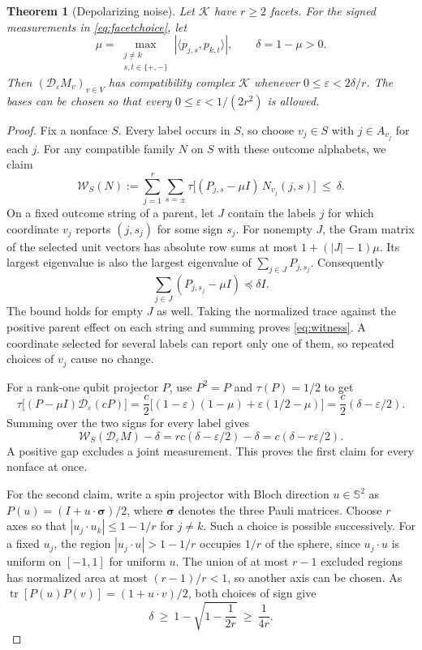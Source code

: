 \documentclass[11pt,a4paper]{article}
\newtheorem{theorem}{Theorem}
\theoremstyle{definition}
\newcommand{\Id}{I}
\newcommand{\tr}{\operatorname{tr}}
\newcommand{\K}{\mathcal K}
\newcommand{\D}{\mathcal D}
\begin{document}
\begin{theorem}[Depolarizing noise]\label{thm:noise}
Let \(\K\) have \(r\ge2\) facets. For the signed measurements
in \eqref{eq:facetchoice}, let
\[
 \mu=\max_{\substack{j\ne k\\s,t\in\{+,-\}}}
                 |\langle p_{j,s},p_{k,t}\rangle|,\qquad
 \delta=1-\mu>0 .
\]
Then \((\D_\varepsilon M_v)_{v\in V}\) has compatibility complex \(\K\)
whenever \(0\le\varepsilon<2\delta/r\). The bases can be chosen so that
every \(0\le\varepsilon<1/(2r^2)\) is allowed.
\end{theorem}
\begin{proof}
Fix a nonface \(S\). Every label occurs in \(S\), so choose \(v_j\in S\)
with \(j\in A_{v_j}\) for each \(j\). For any compatible family \(N\) on
\(S\) with these outcome alphabets, we claim
\begin{equation}\label{eq:witness}
 \mathcal W_S(N):=
 \sum_{j=1}^{r}\sum_{s=\pm}\tau\big[(P_{j,s}-\mu\Id)\,N_{v_j}(j,s)\big]
 \ \le\ \delta .
\end{equation}
On a fixed outcome string of a parent, let \(J\) contain the labels \(j\)
for which coordinate \(v_j\) reports \((j,s_j)\) for some sign \(s_j\).
For nonempty \(J\), the Gram matrix of the selected unit vectors has
absolute row sums at most \(1+(|J|-1)\mu\). Its largest eigenvalue is
also the largest eigenvalue of \(\sum_{j\in J}P_{j,s_j}\). Consequently
\[
   \sum_{j\in J}(P_{j,s_j}-\mu\Id)\preceq\delta\Id .
\]
The bound holds for empty \(J\) as well. Taking the normalized trace
against the positive parent effect on each string and summing proves
\eqref{eq:witness}. A coordinate selected for several labels can report
only one of them, so repeated choices of \(v_j\) cause no change.

For a rank-one qubit projector \(P\), use \(P^2=P\) and \(\tau(P)=1/2\) to get
\[
 \tau\big[(P-\mu\Id)\D_\varepsilon(cP)\big]
 =\frac c2\big[(1-\varepsilon)(1-\mu)+\varepsilon(1/2-\mu)\big]
 =\frac c2(\delta-\varepsilon/2).
\]
Summing over the two signs for every label gives
\begin{equation}\label{eq:gap}
     \mathcal W_S(\D_\varepsilon M)-\delta
       = r c(\delta-\varepsilon/2)-\delta
       = c(\delta-r\varepsilon/2).
\end{equation}
A positive gap excludes a joint measurement. This proves the first claim
for every nonface at once.

For the second claim, write a spin projector with Bloch direction
\(u\in\mathbb S^2\) as \(P(u)=(\Id+u\cdot\boldsymbol\sigma)/2\), where
\(\boldsymbol\sigma\) denotes the three Pauli matrices. Choose \(r\) axes
so that \(|u_j\cdot u_k|\le1-1/r\) for \(j\ne k\). Such a choice is
possible successively. For a fixed \(u_j\), the region
\(|u_j\cdot u|>1-1/r\) occupies \(1/r\) of the sphere, since \(u_j\cdot u\)
is uniform on \([-1,1]\) for uniform \(u\). The union of at most \(r-1\)
excluded regions has normalized area at most \((r-1)/r<1\), so another
axis can be chosen. As
\(\tr[P(u)P(v)]=(1+u\cdot v)/2\), both choices of sign give
\[
  \delta\ \ge\ 1-\sqrt{1-\frac1{2r}}\ \ge\ \frac1{4r}.
\]
\end{proof}
\end{document}

